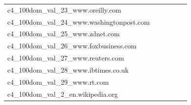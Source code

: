 \documentclass[dvipsnames]{article}
\begin{document}
\begin{appendix}
{\begin{longtable}{m{6cm}m{1.7cm}m{1.7cm}m{1.7cm}m{1.7cm}m{1.7cm}}
	c4\_100dom\_val\_23\_www.oreilly.com  & \colorbox[HTML]{fafdce}{\makebox[\mywidth][c]{13.36}} & \colorbox[HTML]{bae294}{\makebox[\mywidth][c]{12.99}} & \colorbox[HTML]{ffffe5}{\makebox[\mywidth][c]{14.31}} & \colorbox[HTML]{c6e89a}{\makebox[\mywidth][c]{13.02}} & \colorbox[HTML]{77c578}{\makebox[\mywidth][c]{12.88}}\\
	c4\_100dom\_val\_24\_www.washingtonpost.com  & \colorbox[HTML]{fcfed8}{\makebox[\mywidth][c]{12.06}} & \colorbox[HTML]{cdeb9d}{\makebox[\mywidth][c]{11.58}} & \colorbox[HTML]{ffffe5}{\makebox[\mywidth][c]{12.98}} & \colorbox[HTML]{dff2a7}{\makebox[\mywidth][c]{11.64}} & \colorbox[HTML]{77c578}{\makebox[\mywidth][c]{11.41}}\\
	c4\_100dom\_val\_25\_www.zdnet.com  & \colorbox[HTML]{fefee0}{\makebox[\mywidth][c]{13.22}} & \colorbox[HTML]{eff8b3}{\makebox[\mywidth][c]{12.86}} & \colorbox[HTML]{ffffe5}{\makebox[\mywidth][c]{13.80}} & \colorbox[HTML]{ddf1a6}{\makebox[\mywidth][c]{12.78}} & \colorbox[HTML]{77c578}{\makebox[\mywidth][c]{12.61}}\\
	c4\_100dom\_val\_26\_www.foxbusiness.com  & \colorbox[HTML]{ffffe5}{\makebox[\mywidth][c]{9.32}} & \colorbox[HTML]{f8fcc3}{\makebox[\mywidth][c]{9.03}} & \colorbox[HTML]{ffffe5}{\makebox[\mywidth][c]{9.58}} & \colorbox[HTML]{def2a6}{\makebox[\mywidth][c]{8.92}} & \colorbox[HTML]{77c578}{\makebox[\mywidth][c]{8.81}}\\
	c4\_100dom\_val\_27\_www.reuters.com  & \colorbox[HTML]{fefee3}{\makebox[\mywidth][c]{10.67}} & \colorbox[HTML]{d8efa2}{\makebox[\mywidth][c]{10.13}} & \colorbox[HTML]{ffffe5}{\makebox[\mywidth][c]{11.16}} & \colorbox[HTML]{d9f0a3}{\makebox[\mywidth][c]{10.13}} & \colorbox[HTML]{77c578}{\makebox[\mywidth][c]{9.97}}\\
	c4\_100dom\_val\_28\_www.ibtimes.co.uk  & \colorbox[HTML]{ffffe5}{\makebox[\mywidth][c]{11.36}} & \colorbox[HTML]{f8fcc1}{\makebox[\mywidth][c]{11.01}} & \colorbox[HTML]{ffffe5}{\makebox[\mywidth][c]{11.71}} & \colorbox[HTML]{dcf1a5}{\makebox[\mywidth][c]{10.89}} & \colorbox[HTML]{77c578}{\makebox[\mywidth][c]{10.76}}\\
	c4\_100dom\_val\_29\_www.rt.com  & \colorbox[HTML]{fefee3}{\makebox[\mywidth][c]{13.59}} & \colorbox[HTML]{ddf1a6}{\makebox[\mywidth][c]{12.96}} & \colorbox[HTML]{ffffe5}{\makebox[\mywidth][c]{14.24}} & \colorbox[HTML]{e3f4aa}{\makebox[\mywidth][c]{12.98}} & \colorbox[HTML]{77c578}{\makebox[\mywidth][c]{12.74}}\\
	c4\_100dom\_val\_2\_en.wikipedia.org  & \colorbox[HTML]{fdfedf}{\makebox[\mywidth][c]{10.75}} & \colorbox[HTML]{f5fbb8}{\makebox[\mywidth][c]{10.45}} & \colorbox[HTML]{ffffe5}{\makebox[\mywidth][c]{11.32}} & \colorbox[HTML]{d4eea0}{\makebox[\mywidth][c]{10.32}} & \colorbox[HTML]{77c578}{\makebox[\mywidth][c]{10.19}}\\

\end{longtable}}
\end{appendix}
\end{document}
